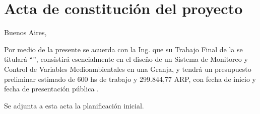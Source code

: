\documentclass[11pt]{charter}
\begin{document}
\section{Acta de constitución del proyecto}
\label{sec:acta}

\begin{flushright}
Buenos Aires, \fechaInicioName
\end{flushright}

\vspace{2cm}

Por medio de la presente se acuerda con la Ing. \authorname\hspace{1px} que su Trabajo Final de la \degreename\hspace{1px} se titulará ``\ttitle'', consistirá esencialmente en el diseño de un Sistema de Monitoreo y Control de Variables Medioambientales en una Granja, y tendrá un presupuesto preliminar estimado de 600 hs de trabajo  y 299.844,77 ARP, con fecha de inicio \fechaInicioName\hspace{1px} y fecha de presentación pública \fechaFinalName.

Se adjunta a esta acta la planificación inicial.

\vfill
\end{document}
